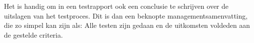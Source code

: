 Het is handig om in een testrapport ook een conclusie te schrijven over de uitslagen van het testproces. Dit is dan een beknopte managementsamenvatting, die zo simpel kan zijn als: Alle testen zijn gedaan en de uitkomsten voldeden aan de gestelde criteria.
